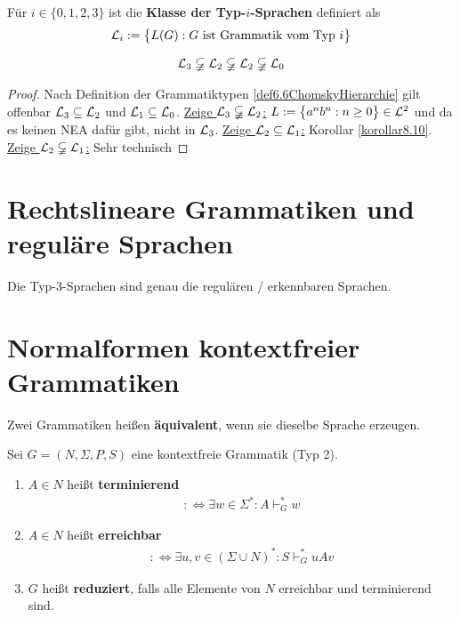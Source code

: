 \begin{definition}\label{def6.7Sprachklassen}
	Für $i\in\lbrace0,1,2,3\rbrace$ ist die \textbf{Klasse der Typ-$i$-Sprachen} definiert als
	\begin{align*}
		\mathcal{L}_i:=\big\lbrace L(G):G\text{ ist Grammatik vom Typ }i\big\rbrace
	\end{align*}
\end{definition}

\begin{satz}
	\begin{align*}
		\mathcal{L}_3\varsubsetneqq\mathcal{L}_2\varsubsetneqq\mathcal{L}_2\varsubsetneqq\mathcal{L}_0
	\end{align*}
\end{satz}

\begin{proof}
	Nach Definition der Grammatiktypen \ref{def6.6ChomskyHierarchie} gilt offenbar $\mathcal{L}_3\subseteq \mathcal{L}_2$ und $\mathcal{L}_1\subseteq\mathcal{L}_0$.\nl
	\underline{Zeige $\mathcal{L}_3\varsubsetneqq\mathcal{L}_2$:} 
	$L:=\big\lbrace a^nb^n:n\geq0\big\rbrace\in\mathcal{L}^2$ und da es keinen NEA dafür gibt, nicht in $\mathcal{L}_3$.\nl
	\underline{Zeige $\mathcal{L}_2\subseteq\mathcal{L}_1$:} Korollar \ref{korollar8.10}.\nl
	\underline{Zeige $\mathcal{L}_2\varsubsetneqq\mathcal{L}_1$:} Sehr technisch
\end{proof}

\section{Rechtslineare Grammatiken und reguläre Sprachen}

\begin{satz}\label{satz7.1}
	Die Typ-3-Sprachen sind genau die regulären / erkennbaren Sprachen.%
\end{satz}

\section{Normalformen kontextfreier Grammatiken}

Zwei Grammatiken heißen \textbf{äquivalent}, wenn sie dieselbe Sprache erzeugen.

\begin{definition}\label{def8.1}
	Sei $G=(N,\Sigma,P,S)$ eine kontextfreie Grammatik (Typ 2).
	\begin{enumerate}[label=\arabic*)]
		\item $A\in N$ heißt \textbf{terminierend}
		\begin{align*}
			:\Longleftrightarrow\exists w\in \Sigma^\ast:A\vdash_G^\ast w
		\end{align*}
		\item $A\in N$ heißt \textbf{erreichbar}
		\begin{align*}
			:\Longleftrightarrow\exists u,v\in(\Sigma\cup N)^\ast:S\vdash_G^\ast uAv
		\end{align*}
		\item $G$ heißt \textbf{reduziert}, falls alle Elemente von $N$ erreichbar und terminierend sind.
	\end{enumerate}
\end{definition}

